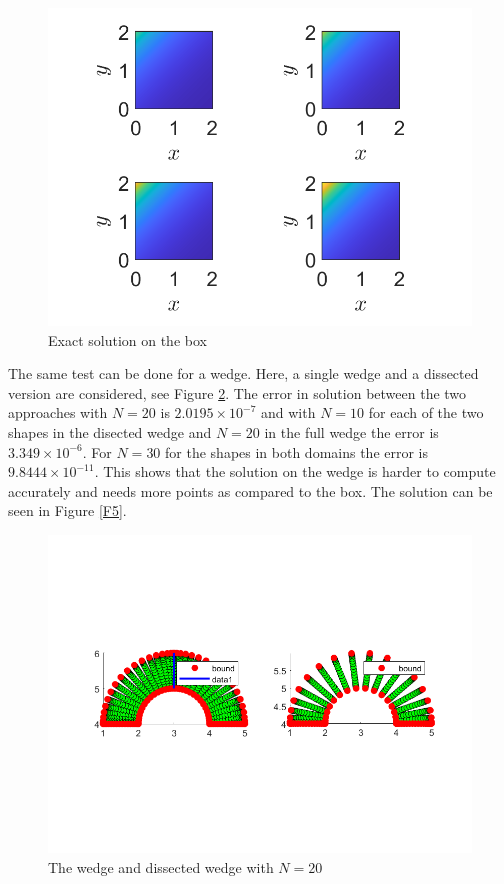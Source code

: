 \documentclass[11pt, a4paper]{article}
\theoremstyle{definition}
\begin{document}
	\begin{figure}[h]
		\centering
		\includegraphics[scale=0.5]{disect2.png}
		\caption{Exact solution on the box} 
		\label{F3}
	\end{figure}
The same test can be done for a wedge. Here, a single wedge and a dissected version are considered, see Figure \ref{F4}. The error in solution between the two approaches with $N = 20$ is $2.0195 \times 10^{-7}$ and with $N = 10$ for each of the two shapes in the disected wedge and $N = 20$ in the full wedge the error is $3.349 \times 10^{-6}$. For $N = 30$ for the shapes in both domains the error is $9.8444 \times 10^{-11}$. This shows that the solution on the wedge is harder to compute accurately and needs more points as compared to the box. The solution can be seen in Figure \ref{F5}.
	\begin{figure}[h]
	\centering
	\includegraphics[scale=0.5]{disectW1.png}
	\caption{The wedge and dissected wedge with $N = 20$} 
	\label{F4}
\end{figure}
\end{document}
